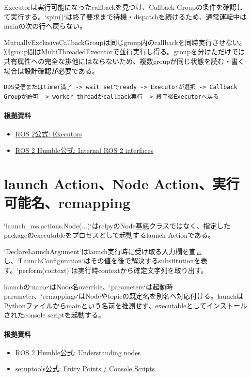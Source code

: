 \documentclass[a4paper,11pt]{article}
\begin{document}
Executorは実行可能になったcallbackを見つけ、Callback Groupの条件を確認して実行する。`spin()`は終了要求まで待機・dispatchを続けるため、通常運転中はmainの次の行へ戻らない。


MutuallyExclusiveCallbackGroupは同じgroup内のcallbackを同時実行させない。別group間はMultiThreadedExecutorで並行実行し得る。groupを分けただけでは共有属性への完全な排他にはならないため、複数groupが同じ状態を読む・書く場合は設計確認が必要である。


\begin{lstlisting}
DDS受信またはtimer満了 -> wait setでready -> Executorが選択 -> Callback Groupが許可 -> worker threadがcallback実行 -> 終了後Executorへ戻る
\end{lstlisting}

\paragraph{根拠資料}
\begin{itemize}[leftmargin=1.6em]
\item \href{https://docs.ros.org/en/rolling/Concepts/Intermediate/About-Executors.html}{ROS 2公式: Executors}
\item \href{https://docs.ros.org/en/humble/Concepts/About-Internal-Interfaces.html}{ROS 2 Humble公式: Internal ROS 2 interfaces}
\end{itemize}

\section{launch Action、Node Action、実行可能名、remapping}
`launch\_ros.actions.Node(...)`はrclpyのNode基底クラスではなく、指定したpackageのexecutableをプロセスとして起動するlaunch Actionである。


`DeclareLaunchArgument`はlaunch実行時に受け取る入力欄を宣言し、`LaunchConfiguration`はその値を後で解決するsubstitutionを表す。`perform(context)`は実行時contextから確定文字列を取り出す。


launchの`name`はNode名override、`parameters`は起動時parameter、`remappings`はNodeやtopicの既定名を別名へ対応付ける。launchはPythonファイルからmainという名前を推測せず、executableとしてインストールされたconsole scriptを起動する。

\paragraph{根拠資料}
\begin{itemize}[leftmargin=1.6em]
\item \href{https://docs.ros.org/en/humble/Tutorials/Beginner-CLI-Tools/Understanding-ROS2-Nodes/Understanding-ROS2-Nodes.html}{ROS 2 Humble公式: Understanding nodes}
\item \href{https://setuptools.pypa.io/en/latest/userguide/entry_point.html}{setuptools公式: Entry Points / Console Scripts}
\end{itemize}
\end{document}
